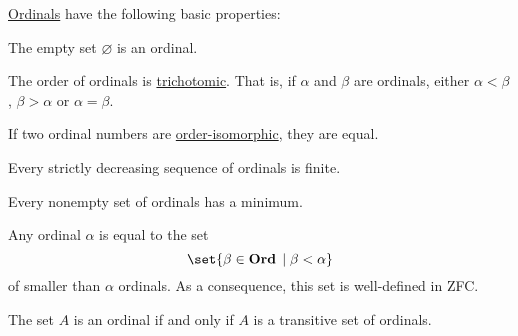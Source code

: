 \begin{proposition}\label{thm:ordinal_properties}
  \hyperref[def:ordinal]{Ordinals} have the following basic properties:
  \begin{thmenum}
     The empty set \( \varnothing \) is an ordinal.

     The order of ordinals is \hyperref[def:binary_relation/trichotomic]{trichotomic}. That is, if \( \alpha \) and \( \beta \) are ordinals, either \( \alpha < \beta \), \( \beta > \alpha \) or \( \alpha = \beta \).

     If two ordinal numbers are \hyperref[def:poset/homomorphism]{order-isomorphic}, they are equal.

     Every strictly decreasing sequence of ordinals is finite.

     Every nonempty set of ordinals has a minimum.

     Any ordinal \( \alpha \) is equal to the set
    \begin{equation}\label{eq:thm:ordinal_properties/set_of_smaller_ordinals}
      \set{ \beta \in \cat{Ord} \given \beta < \alpha }
    \end{equation}
    of smaller than \( \alpha \) ordinals. As a consequence, this set is well-defined in ZFC.

     The set \( A \) is an ordinal if and only if \( A \) is a transitive set of ordinals.
  \end{thmenum}
\end{proposition}
